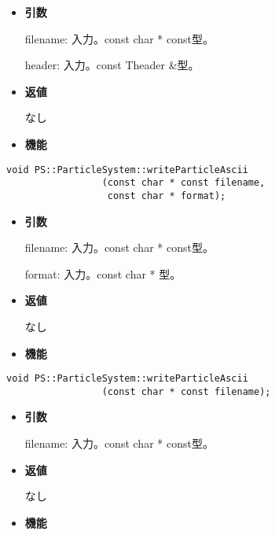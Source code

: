 \begin{itemize}

\item {\bf 引数}

filename: 入力。const char * const型。

header: 入力。const Theader \&型。

\item {\bf 返値}

なし

\item {\bf 機能}


\end{itemize}

\begin{screen}
\begin{verbatim}
void PS::ParticleSystem::writeParticleAscii
                 (const char * const filename,
                  const char * format);
\end{verbatim}
\end{screen}

\begin{itemize}

\item {\bf 引数}

filename: 入力。const char * const型。

format: 入力。const char * 型。

\item {\bf 返値}

なし

\item {\bf 機能}


\end{itemize}

\begin{screen}
\begin{verbatim}
void PS::ParticleSystem::writeParticleAscii
                 (const char * const filename);
\end{verbatim}
\end{screen}

\begin{itemize}

\item {\bf 引数}

filename: 入力。const char * const型。

\item {\bf 返値}

なし

\item {\bf 機能}


\end{itemize}

